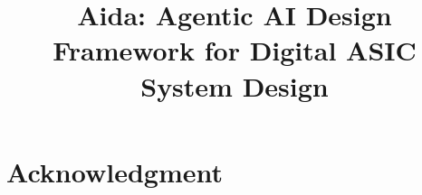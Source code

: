 \documentclass[conference]{IEEEtran}
\begin{document}
\title{Aida: Agentic AI Design Framework for Digital ASIC System Design}


\maketitle




%







\section*{Acknowledgment}



\end{document}
